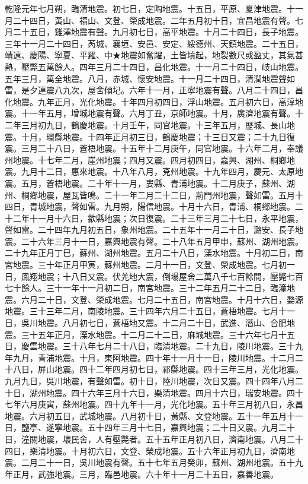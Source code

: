 \begin{pinyinscope}
乾隆元年七月朔，臨清地震。初七日，定陶地震。十五日，平原、夏津地震。十一月二十四日，黃山、福山、文登、榮成地震。二年五月初十日，宜昌地震有聲。七月二十五日，雞澤地震有聲。九月初七日，高平地震。十月二十四日，長子地震。三年十一月二十四日，芮城、襄垣、安邑、安定、綏德州、天鎮地震。二十五日，靖遠、慶陽、寧夏、平羅、中★地震如奮躍，土皆墳起，地裂數尺或盈丈，其氣甚熱，壓斃五萬餘人。四年三月二十四日，昌化地震。十一月二十四日，岐山地震。五年三月，萬全地震。八月，赤城、懷安地震。十一月二十四日，清潤地震聲如雷，是夕連震八九次，屋舍傾圮。六年十一月，正寧地震有聲。八月二十四日，昌化地震。九年正月，光化地震。十年四月初四日，浮山地震。五月初六日，高淳地震。十一年五月，增城地震有聲。六月丁丑，京師地震。十月，廣濟地震有聲。十二年三月初九日，鶴慶地震。十月壬午，同官地震。十三年五月，歷城、長山地震。十月，環縣地震。十四年正月初三日，鶴慶地震；十三日又震；二十九日復震。三月二十八日，蒼梧地震。十五年十二月庚午，同官地震。十六年二月，奉議州地震。十七年二月，崖州地震；四月又震。四月初四日，嘉興、湖州、桐鄉地震。九月十二日，惠來地震。十八年八月，兗州地震。十九年四月，慶元、太原地震。五月，蒼梧地震。二十年十一月，婁縣、青浦地震。十二月庚子，蘇州、湖州、桐鄉地震，屋瓦皆鳴。二十一年二月二十二日，荊門州地震，聲如雷。五月十四日，青城地震，聲如雷。九月朔，陽信地震。十月十六日，青浦、桐鄉地震。二十二年十一月十六日，歙縣地震；次日復震。二十三年三月二十七日，永平地震，聲如雷。二十四年九月初五日，象州地震。二十五年十一月二十日，潞安、長子地震。二十六年三月十一日，嘉興地震有聲。二十八年五月甲申，蘇州、湖州地震。二十九年正月丁巳，蘇州、湖州地震。五月二十八日，溧水地震。十月初二日，南宮地震。三十年正月甲寅，蘇州地震。二月十一日，文登、榮成地震。七月初一日，鳳翔地震；十八日又震。伏羌地大震，倒塌屋舍二萬八千七百餘間，壓斃七百七十餘人。三十一年十一月初二日，南宮地震。三十二年五月二十二日，臨潼地震。六月二十日，文登、榮成地震。七月二十五日，南宮地震。十月十六日，婺源地震。三十三年二月，南陵地震。三十四年六月二十五日，蒼梧地震。七月十一日，吳川地震。八月初七日，蒼梧地又震。十二月二十日，武進、潛山、合肥地震。三十五年正月，溧水地震。十二月二十二日，麻城地震。三十六年七月十五日，慶雲地震。三十八年七月二十八日，臨清地震。二十九日，陵川地震。三十九年九月，青浦地震。十月，東阿地震。四十年十一月十一日，陵川地震。十二月二十八日，屏山地震。四十二年四月初七日，祁縣地震。四十三年三月，光化地震。九月九日，吳川地震，有聲如雷。初十日，陸川地震，次日又震。四十四年八月二十日，湖州地震。四十六年三月十六日，樂清地震。四月十六日，瑞安地震。四十七年六月庚寅，蘇州地震。四十九年十一月，光化地震。五十年三月初八日，永昌地震。六月初五日，武城地震。八月初十日，黃縣、文登地震。五十一年五月十一日，鹽亭、遂寧地震。五十四年三月十七日，嘉興地震；二十日又震。九月二十日，潼關地震，壞民舍，人有壓斃者。五十五年正月初八日，濟南地震。八月二十四日，樂清地震。十月初六日，文登、榮成地震。五十六年正月初九日，濟南地震。二月二十一日，吳川地震有聲。五十七年五月癸卯，蘇州、湖州地震。五十九年正月，武強地震。三月，臨邑地震。六十年十一月二十五日，嘉善地震。


\end{pinyinscope}
